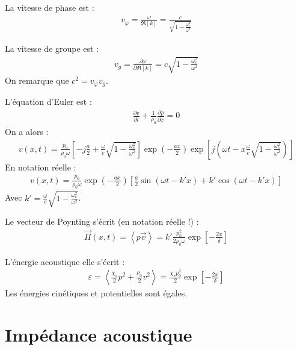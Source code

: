 \documentclass{report}
\begin{document}
\begin{itemize}
	La vitesse de phase est :
	\begin{align*}
		v_\varphi = \frac{\omega}{\Re\left[ k\right] }=\frac{c}{\sqrt{1-\frac{\omega_c^2}{\omega^2}}}
	\end{align*}
	
	La vitesse de groupe est :
	\begin{align*}
		v_g = \frac{\partial\omega}{\partial \Re\left[ k\right] }=c\sqrt{1-\frac{\omega_c^2}{\omega^2}}
	\end{align*}
	On remarque que $c^2=v_\varphi v_g$.
	
	L'équation d'Euler est :
	\begin{align*}
	\frac{\partial v}{\partial t}+\frac{1}{\rho_0}\frac{\partial p}{\partial x}=0
	\end{align*}
	On a alors :
	\begin{align*}
		v(x,t)=\frac{p_0}{\rho_0\omega}\left[-j\frac{a}{2} +\frac{\omega}{c}\sqrt{1-\frac{\omega_c^2}{\omega^2}}\right] \exp\left(-\frac{ax}{2} \right) \exp\left[ j\left(\omega t- x\frac{\omega}{c}\sqrt{1-\frac{\omega_c^2}{\omega^2}}\right) \right] 
	\end{align*}
	En notation réelle :
	\begin{align*}
		v(x,t)=\frac{p_0}{\rho_0\omega}\exp\left(-\frac{ax}{2} \right)\left[\frac{a}{2}\sin(\omega t-k'x) +k'\cos(\omega t- k'x)\right] 
	\end{align*}	
	Avec $k'=\frac{\omega}{c}\sqrt{1-\frac{\omega_c^2}{\omega^2}}$.
	
	Le vecteur de Poynting s'écrit (en notation réelle !) :
	\begin{align*}
		\vec{\Pi}(x,t)=\left\langle p\vec{v} \right\rangle =k'\frac{p_0^2}{2\rho_0\omega}\exp\left[-\frac{2x}{\delta} \right] 
	\end{align*}
	
	L'énergie acoustique elle s'écrit :
	\begin{align*}
		\varepsilon=\left\langle \frac{\chi_s}{2}p^2+\frac{\rho_0}{2}v^2\right\rangle = \frac{\chi_sp_0^2}{2}\exp\left[-\frac{2x}{\delta} \right] 
	\end{align*}
	Les énergies cinétiques et potentielles sont égales.

\end{itemize}

\newpage

\section*{Impédance acoustique}
\end{document}
